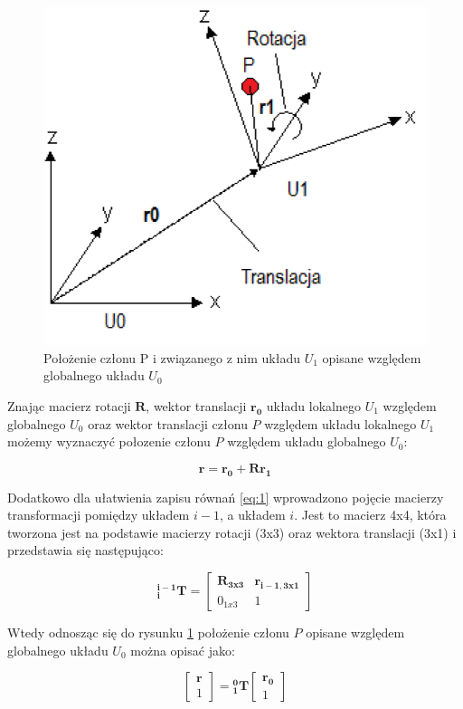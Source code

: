 \documentclass[a4paper, 12pt, twoside]{article}
\begin{document}
\begin{figure}[hbt!]
\centering
\includegraphics[width=0.6\linewidth]{images/kinematic_scheme.png}
\caption{Położenie członu P i związanego z nim układu $U_1$ opisane względem globalnego układu $U_0$ }
\label{fig:kinematic_scheme}
\end{figure}

Znając macierz rotacji $\bm{R}$, wektor translacji $\bm{r_0}$ układu lokalnego $U_1$ względem globalnego $U_0$ oraz wektor translacji członu $P$ względem układu lokalnego $U_1$ możemy wyznaczyć połozenie członu $P$ względem układu globalnego $U_0$:

\begin{equation}  \label{eq:1} 
\bm{r} = \bm{r_0} + \bm{R} \bm{r_1}
\end{equation}

Dodatkowo dla ułatwienia zapisu równań \ref{eq:1} wprowadzono pojęcie macierzy transformacji \cite{systemkozlowski} pomiędzy układem $i-1$, a układem $i$. Jest to macierz 4x4, która tworzona jest na podstawie macierzy rotacji (3x3) oraz wektora translacji (3x1) i przedstawia się następująco:

\begin{equation} \label{eq:2}
\bm{^{i-1}_{i}T} = \begin{bmatrix} 
				   \bm{R_{3x3}} & \bm{r_{i-1,3x1}} \\
				   0_{1x3} & 1 
				   \end{bmatrix}
\end{equation}

Wtedy odnosząc się do rysunku \ref{fig:kinematic_scheme} położenie członu $P$ opisane względem globalnego układu $U_0$ można opisać jako:

\begin{equation} \label{eq:3}
\begin{bmatrix}
\bm{r} \\
1
\end{bmatrix} = \bm{^{0}_{1}T}\begin{bmatrix}
								\bm{r_0} \\
								1
								\end{bmatrix}
\end{equation}
\end{document}
